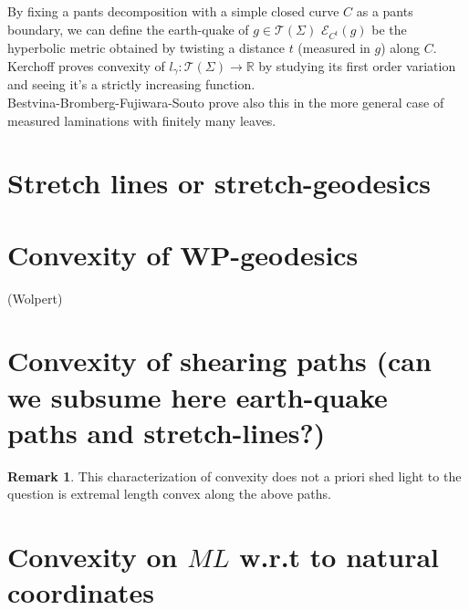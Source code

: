 \documentclass[12pt]{amsart}
\numberwithin{equation}{section}
\numberwithin{figure}{section}
\theoremstyle{definition}
\newtheorem{remark}[theorem]{Remark}
\begin{document}
By fixing a pants decomposition with a simple closed curve $C$ as a pants boundary, we can define the earth-quake of $g \in \mathcal{T}(\Sigma)$ 
$\mathcal{E}_{C^t}(g)$ be the hyperbolic metric obtained by twisting a distance $t$ (measured in $g$) along $C$.
Kerchoff proves convexity of $l_{\gamma}\colon \mathcal{T}(\Sigma) \to \mathbb{R}$ by studying its first order variation and seeing it's a strictly increasing function. \\
Bestvina-Bromberg-Fujiwara-Souto prove also this in the more general case of measured laminations with finitely many leaves.

\section{Stretch lines or stretch-geodesics}



\section{Convexity of WP-geodesics}

(Wolpert)

\section{Convexity of shearing paths (can we subsume here earth-quake paths and stretch-lines?)}


\begin{remark}
This characterization of convexity does not a priori shed light to the question is extremal length convex along the above paths.
\end{remark}

\section{Convexity on $ML$ w.r.t to natural coordinates}
\end{document}
